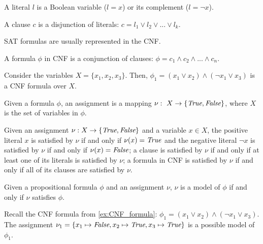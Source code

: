 \begin{definition}[Literal]
A literal \(l\) is a Boolean variable (\(l = x\)) or its complement (\(l = \neg x\)).
\end{definition}

\begin{definition}[Clause]
A clause \(c\) is a disjunction of literals: \(c = l_1 \lor l_2 \lor ... \lor l_k\).
\end{definition}

\noindent
\ac{SAT} formulas are usually represented in the \acf{CNF}. 

\begin{definition}
A formula \(\phi\) in \ac{CNF} is a conjunction of clauses: \(\phi = c_1 \land c_2 \land ... \land c_n\).
\end{definition}

\begin{example}\label{ex:CNF_formula}
Consider the variables \(X = \{x_1, x_2, x_3\}\). Then, \(\phi_1 = (x_1 \lor x_2) \land (\neg x_1 \lor x_3)\) is a \ac{CNF} formula over \(X\).
\end{example}

\begin{definition}[Assignment]
Given a formula \(\phi\), an assignment is a mapping \(\nu:~X\rightarrow\{\textit{True},\textit{False}\}\), where \(X\) is the set of variables in \(\phi\).
\end{definition}

\noindent
Given an assignment \(\nu : X \rightarrow \{\textit{True}, \textit{False}\}\) and a variable \(x \in X\), the positive literal \(x\) is satisfied by \(\nu\) if and only if \(\nu(x) = \textit{True}\) and the negative literal \(\neg x\) is satisfied by \(\nu\) if and only if \(\nu(x) = \textit{False}\); a clause is satisfied by \(\nu\) if and only if at least one of its literals is satisfied by \(\nu\); a formula in CNF is satisfied by \(\nu\) if and only if all of its clauses are satisfied by \(\nu\).

\begin{definition}[Model]
Given a propositional formula  \(\phi\) and an assignment \(\nu\), \(\nu\) is a model of \(\phi\) if and only if \(\nu\) satisfies \(\phi\).
\end{definition}

\begin{example}
Recall the \ac{CNF} formula from \autoref{ex:CNF_formula}: \(\phi_1 = (x_1 \lor x_2) \land (\neg x_1 \lor x_3)\). The assignment \(\nu_1 = \{x_1 \mapsto \textit{False}, x_2 \mapsto \textit{True}, x_3 \mapsto \textit{True}\}\) is a possible model of \(\phi_1\).
\end{example}

